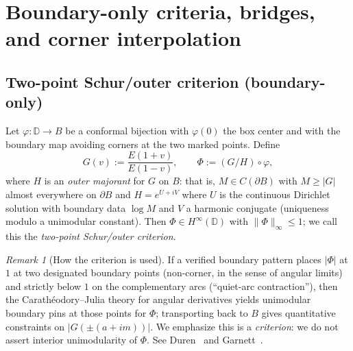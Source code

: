 \documentclass[11pt]{article}
\numberwithin{equation}{section}
\theoremstyle{remark}
\newtheorem{remark}[theorem]{Remark}
\newcommand{\D}{\mathbb{D}}
\begin{document}
\section{Boundary-only criteria, bridges, and corner interpolation}\label{sec:criteria}

\subsection{Two-point Schur/outer criterion (boundary-only)}\label{subsec:schur-criterion}

Let $\varphi:\D\to B$ be a conformal bijection with $\varphi(0)$ the box center and with the boundary map avoiding corners at the two marked points. Define
\begin{equation}\label{eq:schur-def}
G(v):=\frac{E(1+v)}{E(1-v)},\qquad \Phi:=(G/H)\circ\varphi,
\end{equation}
where $H$ is an \emph{outer majorant} for $G$ on $B$: that is, $M\in C(\partial B)$ with $M\ge |G|$ almost everywhere on $\partial B$ and $H=e^{U+iV}$ where $U$ is the continuous Dirichlet solution with boundary data $\log M$ and $V$ a harmonic conjugate (uniqueness modulo a unimodular constant). Then $\Phi\in H^\infty(\D)$ with $\|\Phi\|_\infty\le 1$; we call this the \emph{two-point Schur/outer criterion}.

\begin{remark}[How the criterion is used]
If a verified boundary pattern places $|\Phi|$ at $1$ at two designated boundary points (non-corner, in the sense of angular limits) and strictly below $1$ on the complementary arcs (``quiet-arc contraction''), then the Carath\'eodory--Julia theory for angular derivatives yields unimodular boundary pins at those points for $\Phi$; transporting back to $B$ gives quantitative constraints on $|G(\pm(a+im))|$. We emphasize this is a \emph{criterion}: we do not assert interior unimodularity of $\Phi$. See Duren~\cite[Chs.~II, IV--V]{DurenHp} and Garnett~\cite[Chs.~II--III]{GarnettBAF}.
\end{remark}
\end{document}
